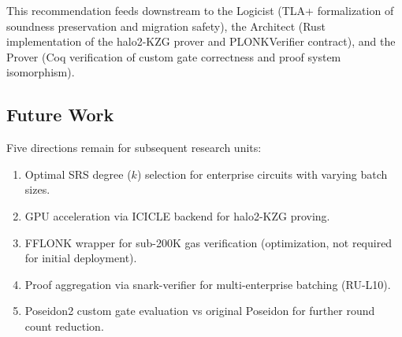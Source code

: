 This recommendation feeds downstream to the Logicist (TLA+
formalization of soundness preservation and migration safety),
the Architect (Rust implementation of the halo2-KZG prover and
PLONKVerifier contract), and the Prover (Coq verification of
custom gate correctness and proof system isomorphism).

\subsection{Future Work}

Five directions remain for subsequent research units:

\begin{enumerate}
  \item Optimal SRS degree ($k$) selection for enterprise circuits
    with varying batch sizes.
  \item GPU acceleration via ICICLE backend for halo2-KZG proving.
  \item FFLONK wrapper for sub-200K gas verification (optimization,
    not required for initial deployment).
  \item Proof aggregation via snark-verifier for multi-enterprise
    batching (RU-L10).
  \item Poseidon2 custom gate evaluation vs original Poseidon for
    further round count reduction.
\end{enumerate}
